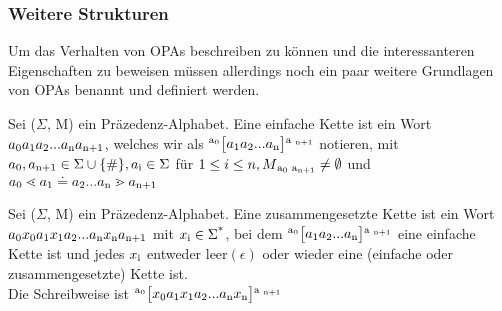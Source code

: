 \subsubsection{Weitere Strukturen}
Um das Verhalten von OPAs beschreiben zu können und die interessanteren Eigenschaften zu beweisen müssen allerdings noch ein paar weitere Grundlagen von OPAs benannt und definiert werden.

\begin{definition}
Sei ($\Sigma$, M) ein Präzedenz-Alphabet. Eine einfache Kette ist ein Wort $a\textsubscript{0} a\textsubscript{1}a\textsubscript{2}...a\textsubscript{n}a\textsubscript{n+1}$, welches wir als $\textsuperscript{a\textsubscript{0}} \big[ a\textsubscript{1} a\textsubscript{2}... a\textsubscript{n} \big] \textsuperscript{a \textsubscript{n+1}}$ notieren,
mit $a\textsubscript{0}, a\textsubscript{n+1} \in \Sigma \cup \{ \# \}, a\textsubscript{i} \in \Sigma$ für $ 1 \leq i \leq n, M\textsubscript{a\textsubscript{0} a\textsubscript{n+1}} \neq \emptyset$ und $ a\textsubscript{0} \lessdot a\textsubscript{1} \doteq a\textsubscript{2}...a\textsubscript{n} \gtrdot a\textsubscript{n+1}$
\end{definition}

\begin{definition}
Sei ($\Sigma$, M) ein Präzedenz-Alphabet. Eine zusammengesetzte Kette ist ein Wort $a\textsubscript{0} x\textsubscript{0} a\textsubscript{1} x\textsubscript{1} a\textsubscript{2}...a\textsubscript{n}x\textsubscript{n} a\textsubscript{n+1}$ mit $x\textsubscript{i} \in \Sigma \textsuperscript{*}$, bei dem $\textsuperscript{a\textsubscript{0}} \big[ a\textsubscript{1} a\textsubscript{2}... a\textsubscript{n} \big] \textsuperscript{a \textsubscript{n+1}}$ eine einfache Kette ist und jedes $x\textsubscript{i}$ entweder leer$(\epsilon)$ oder wieder eine (einfache oder zusammengesetzte) Kette ist.\\
Die Schreibweise ist $\textsuperscript{a\textsubscript{0}} \big[x\textsubscript{0} a\textsubscript{1} x\textsubscript{1} a\textsubscript{2}... a\textsubscript{n} x\textsubscript{n} \big] \textsuperscript{a \textsubscript{n+1}}$
\end{definition}

